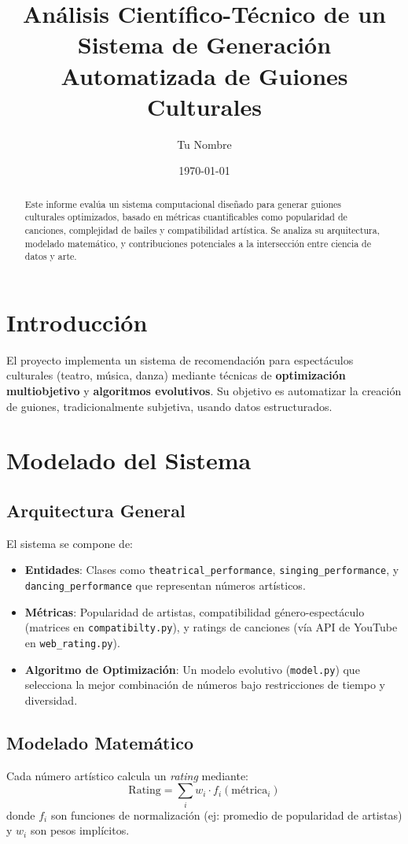 \documentclass{article}
\title{Análisis Científico-Técnico de un Sistema de Generación Automatizada de Guiones Culturales}
\author{Tu Nombre}
\date{\today}
\begin{document}
\maketitle

\begin{abstract}
Este informe evalúa un sistema computacional diseñado para generar guiones culturales optimizados, basado en métricas cuantificables como popularidad de canciones, complejidad de bailes y compatibilidad artística. Se analiza su arquitectura, modelado matemático, y contribuciones potenciales a la intersección entre ciencia de datos y arte.
\end{abstract}

\section{Introducción}
El proyecto implementa un sistema de recomendación para espectáculos culturales (teatro, música, danza) mediante técnicas de \textbf{optimización multiobjetivo} y \textbf{algoritmos evolutivos}. Su objetivo es automatizar la creación de guiones, tradicionalmente subjetiva, usando datos estructurados.

\section{Modelado del Sistema}

\subsection{Arquitectura General}
El sistema se compone de:
\begin{itemize}
    \item \textbf{Entidades}: Clases como \texttt{theatrical\_performance}, \texttt{singing\_performance}, y \texttt{dancing\_performance} que representan números artísticos.
    \item \textbf{Métricas}: Popularidad de artistas, compatibilidad género-espectáculo (matrices en \texttt{compatibilty.py}), y ratings de canciones (vía API de YouTube en \texttt{web\_rating.py}).
    \item \textbf{Algoritmo de Optimización}: Un modelo evolutivo (\texttt{model.py}) que selecciona la mejor combinación de números bajo restricciones de tiempo y diversidad.
\end{itemize}

\subsection{Modelado Matemático}
Cada número artístico calcula un \textit{rating} mediante:
\[
\text{Rating} = \sum_{i} w_i \cdot f_i(\text{métrica}_i)
\]
donde \( f_i \) son funciones de normalización (ej: promedio de popularidad de artistas) y \( w_i \) son pesos implícitos.
\end{document}
